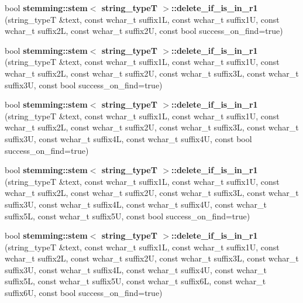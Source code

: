 \begin{DoxyCompactItemize}
\item 
\hypertarget{group___stemming_ga843e54b874cbb56a5d5997987137c933}{bool {\bfseries stemming\-::stem$<$ string\-\_\-type\-T $>$\-::delete\-\_\-if\-\_\-is\-\_\-in\-\_\-r1} (string\-\_\-type\-T \&text, const wchar\-\_\-t suffix1\-L, const wchar\-\_\-t suffix1\-U, const wchar\-\_\-t suffix2\-L, const wchar\-\_\-t suffix2\-U, const bool success\-\_\-on\-\_\-find=true)}\label{group___stemming_ga843e54b874cbb56a5d5997987137c933}

\item 
\hypertarget{group___stemming_gaf5c33c5c4644373cd85390c7e3282084}{bool {\bfseries stemming\-::stem$<$ string\-\_\-type\-T $>$\-::delete\-\_\-if\-\_\-is\-\_\-in\-\_\-r1} (string\-\_\-type\-T \&text, const wchar\-\_\-t suffix1\-L, const wchar\-\_\-t suffix1\-U, const wchar\-\_\-t suffix2\-L, const wchar\-\_\-t suffix2\-U, const wchar\-\_\-t suffix3\-L, const wchar\-\_\-t suffix3\-U, const bool success\-\_\-on\-\_\-find=true)}\label{group___stemming_gaf5c33c5c4644373cd85390c7e3282084}

\item 
\hypertarget{group___stemming_ga6be1595a7c29fec666ff808701be3eb2}{bool {\bfseries stemming\-::stem$<$ string\-\_\-type\-T $>$\-::delete\-\_\-if\-\_\-is\-\_\-in\-\_\-r1} (string\-\_\-type\-T \&text, const wchar\-\_\-t suffix1\-L, const wchar\-\_\-t suffix1\-U, const wchar\-\_\-t suffix2\-L, const wchar\-\_\-t suffix2\-U, const wchar\-\_\-t suffix3\-L, const wchar\-\_\-t suffix3\-U, const wchar\-\_\-t suffix4\-L, const wchar\-\_\-t suffix4\-U, const bool success\-\_\-on\-\_\-find=true)}\label{group___stemming_ga6be1595a7c29fec666ff808701be3eb2}

\item 
\hypertarget{group___stemming_gabac9ef13a80efee3dad9b72476f7cd49}{bool {\bfseries stemming\-::stem$<$ string\-\_\-type\-T $>$\-::delete\-\_\-if\-\_\-is\-\_\-in\-\_\-r1} (string\-\_\-type\-T \&text, const wchar\-\_\-t suffix1\-L, const wchar\-\_\-t suffix1\-U, const wchar\-\_\-t suffix2\-L, const wchar\-\_\-t suffix2\-U, const wchar\-\_\-t suffix3\-L, const wchar\-\_\-t suffix3\-U, const wchar\-\_\-t suffix4\-L, const wchar\-\_\-t suffix4\-U, const wchar\-\_\-t suffix5\-L, const wchar\-\_\-t suffix5\-U, const bool success\-\_\-on\-\_\-find=true)}\label{group___stemming_gabac9ef13a80efee3dad9b72476f7cd49}

\item 
\hypertarget{group___stemming_ga3fbbd1cbf322889ba4e4940d87449bb0}{bool {\bfseries stemming\-::stem$<$ string\-\_\-type\-T $>$\-::delete\-\_\-if\-\_\-is\-\_\-in\-\_\-r1} (string\-\_\-type\-T \&text, const wchar\-\_\-t suffix1\-L, const wchar\-\_\-t suffix1\-U, const wchar\-\_\-t suffix2\-L, const wchar\-\_\-t suffix2\-U, const wchar\-\_\-t suffix3\-L, const wchar\-\_\-t suffix3\-U, const wchar\-\_\-t suffix4\-L, const wchar\-\_\-t suffix4\-U, const wchar\-\_\-t suffix5\-L, const wchar\-\_\-t suffix5\-U, const wchar\-\_\-t suffix6\-L, const wchar\-\_\-t suffix6\-U, const bool success\-\_\-on\-\_\-find=true)}\label{group___stemming_ga3fbbd1cbf322889ba4e4940d87449bb0}


\end{DoxyCompactItemize}
